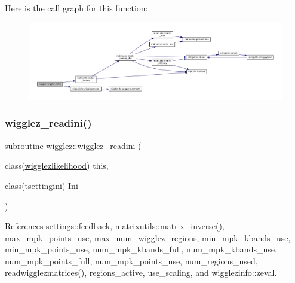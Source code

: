 Here is the call graph for this function\+:
\nopagebreak
\begin{figure}[H]
\begin{center}
\leavevmode
\includegraphics[width=350pt]{namespacewigglez_abf254c63c44f0ccf748dd90a0814a664_cgraph}
\end{center}
\end{figure}
\mbox{\label{namespacewigglez_ae3e0c03dabaa4af8dbaa3d5b1b2acb29}} 
\subsubsection{\texorpdfstring{wigglez\+\_\+readini()}{wigglez\_readini()}}
{\footnotesize\ttfamily subroutine wigglez\+::wigglez\+\_\+readini (\begin{DoxyParamCaption}\item[{class(\mbox{\hyperlink{structwigglez_1_1wigglezlikelihood}{wigglezlikelihood}})}]{this,  }\item[{class(\mbox{\hyperlink{structsettings_1_1tsettingini}{tsettingini}})}]{Ini }\end{DoxyParamCaption})\hspace{0.3cm}{\ttfamily [private]}}



References settings\+::feedback, matrixutils\+::matrix\+\_\+inverse(), max\+\_\+mpk\+\_\+points\+\_\+use, max\+\_\+num\+\_\+wigglez\+\_\+regions, min\+\_\+mpk\+\_\+kbands\+\_\+use, min\+\_\+mpk\+\_\+points\+\_\+use, num\+\_\+mpk\+\_\+kbands\+\_\+full, num\+\_\+mpk\+\_\+kbands\+\_\+use, num\+\_\+mpk\+\_\+points\+\_\+full, num\+\_\+mpk\+\_\+points\+\_\+use, num\+\_\+regions\+\_\+used, readwigglezmatrices(), regions\+\_\+active, use\+\_\+scaling, and wigglezinfo\+::zeval.

